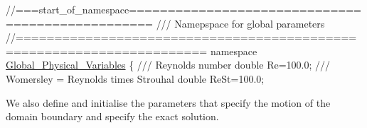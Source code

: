  
\begin{DoxyCodeInclude}
\textcolor{comment}{//===start\_of\_namespace=================================================}
\textcolor{comment}{/// Namepspace for global parameters}
\textcolor{comment}{}\textcolor{comment}{//======================================================================}
\textcolor{keyword}{namespace }\hyperlink{namespaceGlobal__Physical__Variables}{Global\_Physical\_Variables}
\{
\textcolor{comment}{}
\textcolor{comment}{ /// Reynolds number}
\textcolor{comment}{} \textcolor{keywordtype}{double} Re=100.0;
\textcolor{comment}{}
\textcolor{comment}{ /// Womersley = Reynolds times Strouhal}
\textcolor{comment}{} \textcolor{keywordtype}{double} ReSt=100.0;

\end{DoxyCodeInclude}


We also define and initialise the parameters that specify the motion of the domain boundary and specify the exact solution.


